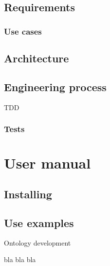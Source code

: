 \documentclass{report}
\begin{document}
\section{Requirements}

\subsection{Use cases}

\section{Architecture}

\section{Engineering process}
TDD

\subsection{Tests}

\chapter{User manual}

\section{Installing}

\section{Use examples}


Ontology development

bla bla bla \cite{vrandevcic06}



\end{document}
